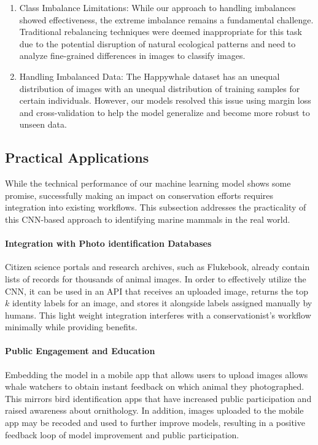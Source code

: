 \documentclass[twocolumn]{article}
\begin{document}
\begin{enumerate}
    \item Class Imbalance Limitations: While our approach to handling imbalances showed effectiveness, the extreme imbalance remains a fundamental challenge. Traditional rebalancing techniques were deemed inappropriate for this task due to the potential disruption of natural ecological patterns and need to analyze fine-grained differences in images to classify images. 
    \item Handling Imbalanced Data: The Happywhale dataset has an unequal distribution of images with an unequal distribution of training samples for certain individuals. However, our models resolved this issue using margin loss and cross-validation to help the model generalize and become more robust to unseen data.
\end{enumerate}

\subsection{Practical Applications}

While the technical performance of our machine learning model shows some promise, successfully making an impact on conservation efforts requires integration into existing workflows. This subsection addresses the practicality of this CNN-based approach to identifying marine mammals in the real world.

\paragraph{Integration with Photo identification Databases}

Citizen science portals and research archives, such as Flukebook, already contain lists of records for thousands of animal images. In order to effectively utilize the CNN, it can be used in an API that receives an uploaded image, returns the top $k$ identity labels for an image, and stores it alongside labels assigned manually by humans. This light weight integration interferes with a conservationist's workflow minimally while providing benefits.

\paragraph{Public Engagement and Education}

Embedding the model in a mobile app that allows users to upload images allows whale watchers to obtain instant feedback on which animal they photographed. This mirrors bird identification apps that have increased public participation and raised awareness about ornithology.  In addition, images uploaded to the mobile app may be recoded and used to further improve models, resulting in a positive feedback loop of model improvement and public participation.
\end{document}
